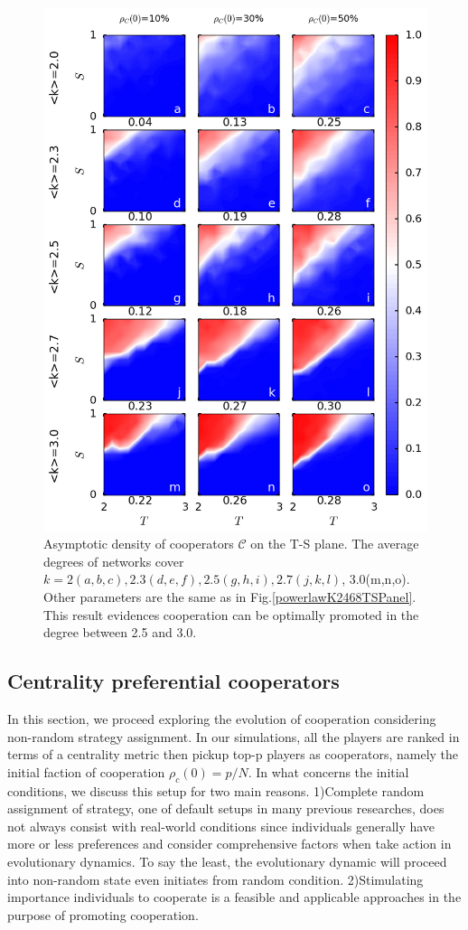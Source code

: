 \documentclass[preprint,12pt,3p]{elsarticle}
\begin{document}
\begin{figure}[htbp]
\centering
\includegraphics[width=12cm]{powerlawK23TSPanel.png}

\caption{Asymptotic density of cooperators $\mathcal{C}$ on the T-S plane.
The average degrees of networks cover $k=2(a,b,c),2.3(d,e,f),2.5(g,h,i),2.7(j,k,l)$, 3.0(m,n,o).
Other parameters are the same as in Fig.\ref{powerlawK2468TSPanel}.
This result evidences cooperation can be optimally promoted in the degree between 2.5 and 3.0.}
\label{powerlawK23TSPanel}
\end{figure}


\subsection{Centrality preferential cooperators}

    In this section, we proceed exploring the evolution of cooperation considering non-random strategy assignment.
In our simulations, all the players are ranked in terms of a centrality metric then pickup top-p players as cooperators,
namely the initial faction of cooperation $\rho_c(0)=p/N$.
    In what concerns the initial conditions, we discuss this
setup for two main reasons.
    1)Complete random assignment of strategy, one of default setups in many previous
researches, does not always consist with real-world conditions since individuals generally have more or less preferences and consider comprehensive factors when take action in evolutionary dynamics.
To say the least, the evolutionary dynamic will proceed into non-random state even initiates from random condition.
    2)Stimulating importance individuals to cooperate is a feasible and applicable approaches in the purpose of promoting cooperation.
\end{document}
